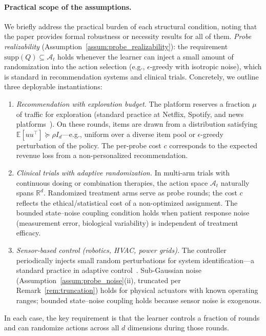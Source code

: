 \documentclass{article}
\newcommand{\R}{\mathbb{R}}
\newcommand{\E}{\mathbb{E}}
\newcommand{\cA}{\mathcal{A}}
\newcommand{\supp}{\mathrm{supp}}
\begin{document}
  \paragraph{Practical scope of the assumptions.}
  We briefly address the practical burden of each structural condition,
  noting that the paper provides formal robustness or necessity results
  for all of them.
  \emph{Probe realizability} (Assumption~\ref{assum:probe_realizability}):
  the requirement $\supp(Q) \subseteq \cA_t$ holds whenever the learner
  can inject a small amount of randomization into the action selection
  (e.g., $\epsilon$-greedy with isotropic noise), which is standard in
  recommendation systems and clinical trials.
 Concretely, we outline three deployable instantiations:
  \begin{enumerate}[nosep,leftmargin=2em]
  \item \emph{Recommendation with exploration budget.}
  The platform reserves a fraction $\mu$ of traffic for exploration (standard practice at Netflix, Spotify, and news
  platforms~\citep{li2010contextual}). On these rounds, items are drawn from a distribution satisfying $\E[uu^\top]\succeq \rho
  I_d$---e.g., uniform over a diverse item pool or $\epsilon$-greedy perturbation of the policy. The per-probe cost $c$ corresponds
  to the expected revenue loss from a non-personalized recommendation.
  \item \emph{Clinical trials with adaptive randomization.}
  In multi-arm trials with continuous dosing or combination therapies, the action space $\cA_t$ naturally spans $\R^d$. Randomized
  treatment arms serve as probe rounds; the cost $c$ reflects the ethical/statistical cost of a non-optimized assignment. The
  bounded state--noise coupling condition holds when patient response noise (measurement error, biological variability) is independent
  of treatment efficacy.
  \item \emph{Sensor-based control (robotics, HVAC, power grids).}
  The controller periodically injects small random perturbations for system identification---a standard practice in adaptive
  control~\citep{memmel2024asid}. Sub-Gaussian noise (Assumption~\ref{assum:probe_noise}(ii), truncated per Remark~\ref{rem:truncation}) holds for physical actuators with
  known operating ranges; bounded state--noise coupling holds because sensor noise is exogenous.
  \end{enumerate}
  In each case, the key requirement is that the learner controls a fraction of rounds and can randomize actions across all $d$
  dimensions during those rounds.
\end{document}
